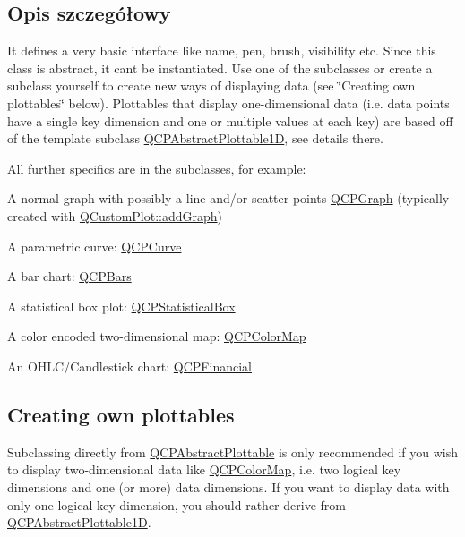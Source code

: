 \subsection{Opis szczegółowy}
It defines a very basic interface like name, pen, brush, visibility etc. Since this class is abstract, it can\textquotesingle{}t be instantiated. Use one of the subclasses or create a subclass yourself to create new ways of displaying data (see \char`\"{}\+Creating own plottables\char`\"{} below). Plottables that display one-\/dimensional data (i.\+e. data points have a single key dimension and one or multiple values at each key) are based off of the template subclass \hyperlink{class_q_c_p_abstract_plottable1_d}{Q\+C\+P\+Abstract\+Plottable1D}, see details there.

All further specifics are in the subclasses, for example\+: \begin{DoxyItemize}
\item A normal graph with possibly a line and/or scatter points \hyperlink{class_q_c_p_graph}{Q\+C\+P\+Graph} (typically created with \hyperlink{class_q_custom_plot_a6fb2873d35a8a8089842d81a70a54167}{Q\+Custom\+Plot\+::add\+Graph}) \item A parametric curve\+: \hyperlink{class_q_c_p_curve}{Q\+C\+P\+Curve} \item A bar chart\+: \hyperlink{class_q_c_p_bars}{Q\+C\+P\+Bars} \item A statistical box plot\+: \hyperlink{class_q_c_p_statistical_box}{Q\+C\+P\+Statistical\+Box} \item A color encoded two-\/dimensional map\+: \hyperlink{class_q_c_p_color_map}{Q\+C\+P\+Color\+Map} \item An O\+H\+L\+C/\+Candlestick chart\+: \hyperlink{class_q_c_p_financial}{Q\+C\+P\+Financial}\end{DoxyItemize}
\hypertarget{class_q_c_p_abstract_plottable_plottables-subclassing}{}\subsection{Creating own plottables}\label{class_q_c_p_abstract_plottable_plottables-subclassing}
Subclassing directly from \hyperlink{class_q_c_p_abstract_plottable}{Q\+C\+P\+Abstract\+Plottable} is only recommended if you wish to display two-\/dimensional data like \hyperlink{class_q_c_p_color_map}{Q\+C\+P\+Color\+Map}, i.\+e. two logical key dimensions and one (or more) data dimensions. If you want to display data with only one logical key dimension, you should rather derive from \hyperlink{class_q_c_p_abstract_plottable1_d}{Q\+C\+P\+Abstract\+Plottable1D}.


